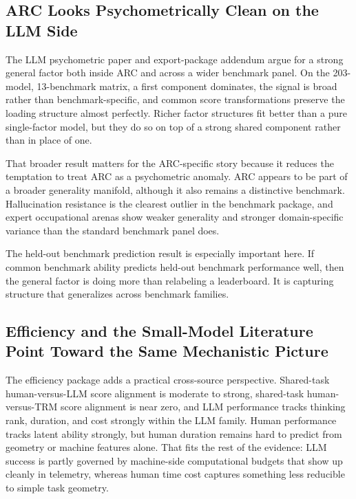 \documentclass[11pt,letterpaper]{article}
\begin{document}
\subsection{ARC Looks Psychometrically Clean on the LLM Side}

The LLM psychometric paper and export-package addendum argue for a strong general factor both inside ARC and across a wider benchmark panel. On the 203-model, 13-benchmark matrix, a first component dominates, the signal is broad rather than benchmark-specific, and common score transformations preserve the loading structure almost perfectly. Richer factor structures fit better than a pure single-factor model, but they do so on top of a strong shared component rather than in place of one.

That broader result matters for the ARC-specific story because it reduces the temptation to treat ARC as a psychometric anomaly. ARC appears to be part of a broader generality manifold, although it also remains a distinctive benchmark. Hallucination resistance is the clearest outlier in the benchmark package, and expert occupational arenas show weaker generality and stronger domain-specific variance than the standard benchmark panel does.

The held-out benchmark prediction result is especially important here. If common benchmark ability predicts held-out benchmark performance well, then the general factor is doing more than relabeling a leaderboard. It is capturing structure that generalizes across benchmark families.

\subsection{Efficiency and the Small-Model Literature Point Toward the Same Mechanistic Picture}

The efficiency package adds a practical cross-source perspective. Shared-task human-versus-LLM score alignment is moderate to strong, shared-task human-versus-TRM score alignment is near zero, and LLM performance tracks thinking rank, duration, and cost strongly within the LLM family. Human performance tracks latent ability strongly, but human duration remains hard to predict from geometry or machine features alone. That fits the rest of the evidence: LLM success is partly governed by machine-side computational budgets that show up cleanly in telemetry, whereas human time cost captures something less reducible to simple task geometry.
\end{document}
